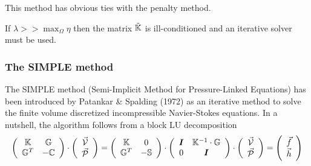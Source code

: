 \begin{remark} 
This method has obvious ties with the penalty method. 
\end{remark}

\begin{remark} 
If $\lambda >> \max_\Omega{\eta}$ then the matrix $\tilde{{\mathbb{K}}}$ is ill-conditioned and an iterative solver must be used.
\end{remark}

\subsubsection{The SIMPLE method}

The SIMPLE method (Semi-Implicit Method for Pressure-Linked Equations)
has been introduced by Patankar \& Spalding (1972) \cite{pasp72} as an iterative method to solve
the finite volume discretized incompressible Navier-Stokes equations. 
In a nutshell, the algorithm follows from a block LU decomposition
\begin{equation}
\left(
\begin{array}{cc}
{\mathbb{K}} & {\mathbb{G}} \\ {\mathbb{G}}^T & -{\mathbb{C}} 
\end{array}
\right)
\cdot
\left(
\begin{array}{c}
\vec{\cal V} \\ \vec{\cal P}
\end{array}
\right)
=
\left(
\begin{array}{cc}
{\mathbb{K}} & 0 \\ 
{\mathbb{G}}^T & -{\mathbb{S}}
\end{array}
\right)
\cdot
\left(
\begin{array}{cc}
{\bm I} & {\mathbb{K}}^{-1} \cdot {\mathbb{G}} \\
0 & {\bm I} 
\end{array}
\right)
\cdot
\left(
\begin{array}{c}
\vec{\cal V} \\ \vec{\cal P}
\end{array}
\right)
=
\left(
\begin{array}{c}
\vec{f} \\ \vec{h}
\end{array}
\right)
\end{equation}
